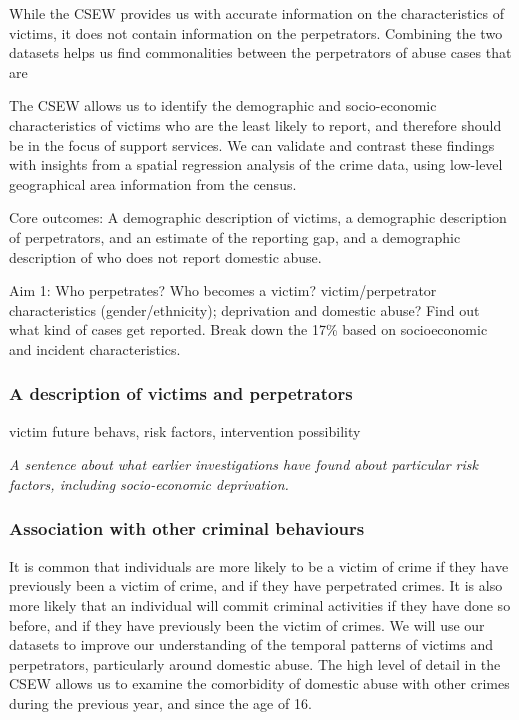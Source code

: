 \documentclass[11pt, a4paper]{article}
\begin{document}
While the CSEW provides us with accurate information on the characteristics of victims, it does not contain information on the perpetrators. Combining the two datasets helps us find commonalities between the perpetrators of abuse cases that are 

The CSEW allows us to identify the demographic and socio-economic characteristics of victims who are the least likely to report, and therefore should be in the focus of support services. We can validate and contrast these findings with insights from a spatial regression analysis of the crime data, using low-level geographical area information from the census. 

Core outcomes: A demographic description of victims, a demographic description of perpetrators, and an estimate of the reporting gap, and a demographic description of who does not report domestic abuse.

Aim 1: Who perpetrates? Who becomes a victim? victim/perpetrator characteristics (gender/ethnicity); deprivation and domestic abuse? Find out what kind of cases get reported. Break down the 17\% based on socioeconomic and incident characteristics.



\subsubsection{A description of victims and perpetrators}

victim future behavs, risk factors, intervention possibility

\textit{A sentence about what earlier investigations have found about particular risk factors, including socio-economic deprivation.} 


\subsubsection{Association with other criminal behaviours}

It is common that individuals are more likely to be a victim of crime if they have previously been a victim of crime, and if they have perpetrated crimes. It is also more likely that an individual will commit criminal activities if they have done so before, and if they have previously been the victim of crimes. We will use our datasets to improve our understanding of the temporal patterns of victims and perpetrators, particularly around domestic abuse. The high level of detail in the CSEW allows us to examine the comorbidity of domestic abuse with other crimes during the previous year, and since the age of 16. 
\end{document}
